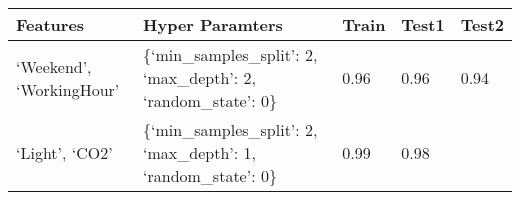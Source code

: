 \documentclass[11pt]{article}
\begin{document}
    \begin{longtable}[]{@{}lllll@{}}
\toprule
\begin{minipage}[b]{0.29\columnwidth}\raggedright
Features\strut
\end{minipage} & \begin{minipage}[b]{0.41\columnwidth}\raggedright
Hyper Paramters\strut
\end{minipage} & \begin{minipage}[b]{0.05\columnwidth}\raggedright
Train\strut
\end{minipage} & \begin{minipage}[b]{0.05\columnwidth}\raggedright
Test1\strut
\end{minipage} & \begin{minipage}[b]{0.05\columnwidth}\raggedright
Test2\strut
\end{minipage}\tabularnewline
\midrule
\endhead
\begin{minipage}[t]{0.29\columnwidth}\raggedright
`Weekend', `WorkingHour'\strut
\end{minipage} & \begin{minipage}[t]{0.41\columnwidth}\raggedright
\{`min\_samples\_split': 2, `max\_depth': 2, `random\_state': 0\}\strut
\end{minipage} & \begin{minipage}[t]{0.05\columnwidth}\raggedright
0.96\strut
\end{minipage} & \begin{minipage}[t]{0.05\columnwidth}\raggedright
0.96\strut
\end{minipage} & \begin{minipage}[t]{0.05\columnwidth}\raggedright
0.94\strut
\end{minipage}\tabularnewline
\begin{minipage}[t]{0.29\columnwidth}\raggedright
`Light', `CO2'\strut
\end{minipage} & \begin{minipage}[t]{0.41\columnwidth}\raggedright
\{`min\_samples\_split': 2, `max\_depth': 1, `random\_state': 0\}\strut
\end{minipage} & \begin{minipage}[t]{0.05\columnwidth}\raggedright
0.99\strut
\end{minipage} & \begin{minipage}[t]{0.05\columnwidth}\raggedright
0.98\strut
\end{minipage} & \begin{minipage}[t]{0.05\columnwidth}\raggedright

\end{minipage}
\end{longtable}
\end{document}
